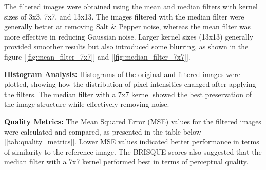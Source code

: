 \documentclass[11pt,letterpaper,twocolumn]{article}
\begin{document}
The filtered images were obtained using the mean and median filters with kernel sizes of 3x3, 7x7, and 13x13. The images filtered with the median filter were generally better at removing Salt \& Pepper noise, whereas the mean filter was more effective in reducing Gaussian noise. Larger kernel sizes (13x13) generally provided smoother results but also introduced some blurring, as shown in the figure [\ref{fig:mean_filter_7x7}] and [\ref{fig:median_filter_7x7}].\par
\textbf{Histogram Analysis:} Histograms of the original and filtered images were plotted, showing how the distribution of pixel intensities changed after applying the filters. The median filter with a 7x7 kernel showed the best preservation of the image structure while effectively removing noise. \par \vspace{5mm}
\textbf{Quality Metrics:} The Mean Squared Error (MSE) values
for the filtered images were calculated and compared, as presented in the table below [\ref{tab:quality_metrics}]. Lower MSE values indicated better performance in terms of similarity to the reference image. The BRISQUE scores also suggested that the median filter with a 7x7 kernel performed best in terms of perceptual quality.\par \vspace{5mm}
\end{document}
